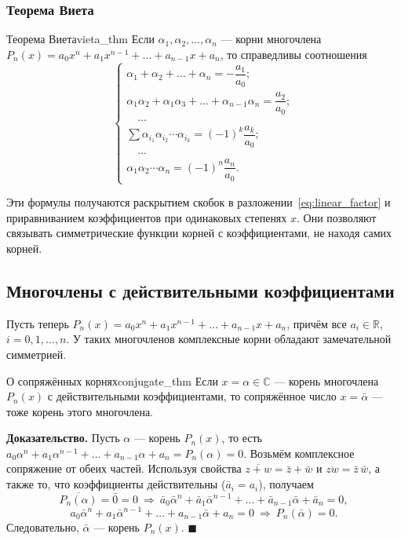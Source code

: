 \documentclass[12pt,a4paper]{article}
\newenvironment{myproof}{\noindent\textbf{Доказательство.}}{\hfill$\blacksquare$}
\begin{document}
\subsubsection*{Теорема Виета}

\begin{theorem}{Теорема Виета}{vieta_thm}
Если $\alpha_1, \alpha_2, \dots, \alpha_n$ — корни многочлена
$P_n(x) = a_0 x^n + a_1 x^{n-1} + \dots + a_{n-1} x + a_n$, то
справедливы соотношения
\[
\begin{cases}
  \alpha_1 + \alpha_2 + \dots + \alpha_n
  = -\dfrac{a_1}{a_0}; \\[2mm]
  \alpha_1\alpha_2 + \alpha_1\alpha_3 + \dots + \alpha_{n-1}\alpha_n
  = \dfrac{a_2}{a_0}; \\[2mm]
  \quad\dots \\[1mm]
  \displaystyle\sum \alpha_{i_1}\alpha_{i_2}\cdots\alpha_{i_k}
  = (-1)^k \dfrac{a_k}{a_0}; \\[2mm]
  \quad\dots \\[1mm]
  \alpha_1\alpha_2 \cdots \alpha_n
  = (-1)^n \dfrac{a_n}{a_0}.
\end{cases}
\]
\end{theorem}

\noindent Эти формулы получаются раскрытием скобок в
разложении~\eqref{eq:linear_factor} и приравниванием коэффициентов при
одинаковых степенях $x$. Они позволяют связывать симметрические
функции корней с коэффициентами, не находя самих корней.

\subsection*{Многочлены с действительными коэффициентами}

Пусть теперь $P_n(x) = a_0 x^n + a_1 x^{n-1} + \dots + a_{n-1} x + a_n$,
причём все $a_i \in \mathbb{R}$, $i = 0, 1, \dots, n$. У таких
многочленов комплексные корни обладают замечательной симметрией.

\begin{theorem}{О сопряжённых корнях}{conjugate_thm}
Если $x = \alpha \in \mathbb{C}$ — корень многочлена $P_n(x)$ с
действительными коэффициентами, то сопряжённое число
$x = \bar{\alpha}$ — тоже корень этого многочлена.
\end{theorem}

\begin{myproof}
Пусть $\alpha$ — корень $P_n(x)$, то есть
$a_0 \alpha^n + a_1 \alpha^{n-1} + \dots + a_{n-1}\alpha + a_n
= P_n(\alpha) = 0$.
Возьмём комплексное сопряжение от обеих частей. Используя свойства
$\overline{z + w} = \bar{z} + \bar{w}$ и
$\overline{zw} = \bar{z}\,\bar{w}$, а также то, что коэффициенты
действительны ($\bar{a}_i = a_i$), получаем
\[
\overline{P_n(\alpha)} = \bar{0} = 0
\ \Longrightarrow\
\bar a_0 \bar\alpha^{n} + \bar a_1 \bar\alpha^{n-1} + \dots
+ \bar a_{n-1}\bar\alpha + \bar a_n = 0,
\]
\[
a_0 \bar\alpha^{n} + a_1 \bar\alpha^{n-1} + \dots
+ a_{n-1}\bar\alpha + a_n = 0
\ \Longrightarrow\
P_n(\bar\alpha) = 0.
\]
Следовательно, $\bar\alpha$ — корень $P_n(x)$.
\end{myproof}
\end{document}
